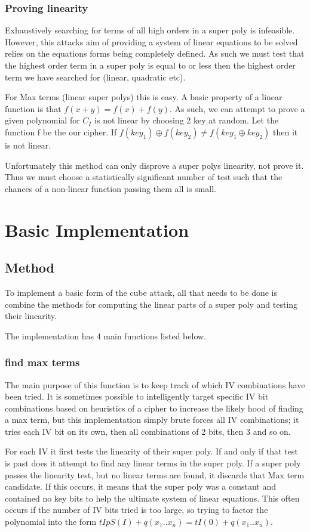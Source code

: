 \documentclass{report}
\let\Oldsection\section
\renewcommand{\section}{\FloatBarrier\Oldsection}
\let\Oldsubsection\subsection
\renewcommand{\subsection}{\FloatBarrier\Oldsubsection}
\let\Oldsubsubsection\subsubsection
\renewcommand{\subsubsection}{\FloatBarrier\Oldsubsubsection}
\begin{document}
\subsubsection{Proving linearity}
Exhaustively searching for terms of all high orders in a super poly is infeasible. However, this attacks aim of providing a system of linear equations to be solved relies on the equations forms being completely defined. As such we must test that the highest order term in a super poly is equal to or less then the highest order term we have searched for (linear, quadratic etc).

For Max terms (linear super polys) this is easy. A basic property of a linear function is that $f(x+y)=f(x)+f(y)$.%
As such, we can attempt to prove a given polynomial for $C_I$ is not linear by choosing 2 key at random. Let the function f be the our cipher. If $f(key_1)\oplus f(key_2) \neq f(key_1 \oplus key_2)$ then it is not linear.

Unfortunately this method can only disprove a super polys linearity, not prove it. Thus we must choose a statistically significant number of test such that the chances of a non-linear function passing them all is small.%

\section{Basic Implementation}
\subsection{Method}
To implement a basic form of the cube attack, all that needs to be done is combine the methods for computing the linear parts of a super poly and testing their linearity.

The implementation has 4 main functions listed below.

\subsubsection{find max terms}
The main purpose of this function is to keep track of which IV combinations have been tried. It is sometimes possible to intelligently target specific IV bit combinations based on heuristics of a cipher to increase the likely hood of finding a max term, but this implementation simply brute forces all IV combinations; it tries each IV bit on its own, then all combinations of 2 bits, then 3 and so on.

For each IV it first tests the linearity of their super poly. If and only if that test is past does it attempt to find any linear terms in the super poly. If a super poly passes the linearity test, but no linear terms are found, it discards that Max term candidate. If this occurs, it means that the super poly was a constant and contained no key bits to help the ultimate system of linear equations. This often occurs if the number of IV bits tried is too large, so trying to factor the polynomial into the form $tIpS(I)+q(x_1..x_n)=tI(0)+q(x_1..x_n)$.
\end{document}
